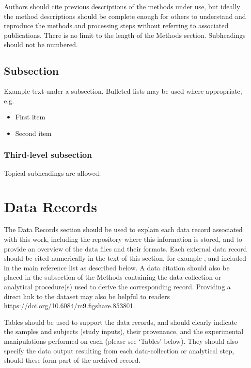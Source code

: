\documentclass[fleqn,10pt]{wlscirep}
\providecommand{\tightlist}{%
  \setlength{\itemsep}{0pt}\setlength{\parskip}{0pt}}
\begin{document}
Authors should cite previous descriptions of the methods under use, but
ideally the method descriptions should be complete enough for others to
understand and reproduce the methods and processing steps without
referring to associated publications. There is no limit to the length of
the Methods section. Subheadings should not be numbered.

\hypertarget{subsection}{%
\subsection{Subsection}\label{subsection}}

Example text under a subsection. Bulleted lists may be used where
appropriate, e.g.

\begin{itemize}
\tightlist
\item
  First item
\item
  Second item
\end{itemize}

\hypertarget{third-level-subsection}{%
\subsubsection{Third-level subsection}\label{third-level-subsection}}

Topical subheadings are allowed.

\hypertarget{data-records}{%
\section{Data Records}\label{data-records}}

The Data Records section should be used to explain each data record
associated with this work, including the repository where this
information is stored, and to provide an overview of the data files and
their formats. Each external data record should be cited numerically in
the text of this section, for example \citep{Hao:gidmaps:2014}, and
included in the main reference list as described below. A data citation
should also be placed in the subsection of the Methods containing the
data-collection or analytical procedure(s) used to derive the
corresponding record. Providing a direct link to the dataset may also be
helpful to readers \url{https://doi.org/10.6084/m9.figshare.853801}.

Tables should be used to support the data records, and should clearly
indicate the samples and subjects (study inputs), their provenance, and
the experimental manipulations performed on each (please see `Tables'
below). They should also specify the data output resulting from each
data-collection or analytical step, should these form part of the
archived record.
\end{document}
